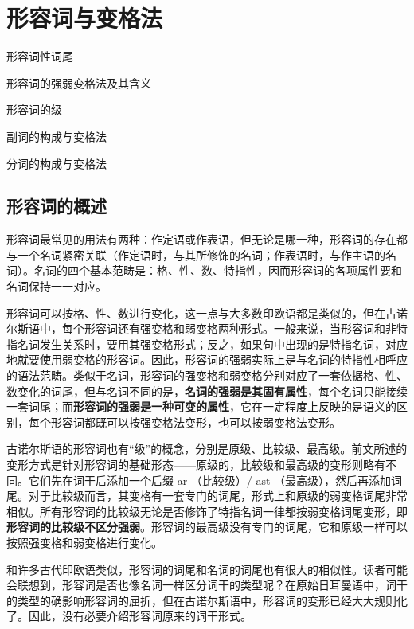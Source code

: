 \chapter{形容词与变格法}\label{形容词与变格法}

\begin{introduction}[章节要点]
    \item 形容词性词尾
    \item 形容词的强弱变格法及其含义
    \item 形容词的级
    \item 副词的构成与变格法
    \item 分词的构成与变格法
\end{introduction}

\section{形容词的概述}\label{形容词的概述}

形容词最常见的用法有两种：作定语或作表语，但无论是哪一种，形容词的存在都与一个名词紧密关联（作定语时，与其所修饰的名词；作表语时，与作主语的名词）。名词的四个基本范畴是：格、性、数、特指性，因而形容词的各项属性要和名词保持一一对应。

形容词可以按格、性、数进行变化，这一点与大多数印欧语都是类似的，但在古诺尔斯语中，每个形容词还有强变格和弱变格两种形式。一般来说，当形容词和非特指名词发生关系时，要用其强变格形式；反之，如果句中出现的是特指名词，对应地就要使用弱变格的形容词。因此，形容词的强弱实际上是与名词的特指性相呼应的语法范畴。类似于名词，形容词的强变格和弱变格分别对应了一套依据格、性、数变化的词尾，但与名词不同的是，\textbf{名词的强弱是其固有属性}，每个名词只能接续一套词尾；而\textbf{形容词的强弱是一种可变的属性}，它在一定程度上反映的是语义的区别，每个形容词都既可以按强变格法变形，也可以按弱变格法变形。

古诺尔斯语的形容词也有“级”的概念，分别是原级、比较级、最高级。前文所述的变形方式是针对形容词的基础形态——原级的，比较级和最高级的变形则略有不同。它们先在词干后添加一个后缀-ar-（比较级）/-ast-（最高级），然后再添加词尾。对于比较级而言，其变格有一套专门的词尾，形式上和原级的弱变格词尾非常相似。所有形容词的比较级无论是否修饰了特指名词一律都按弱变格词尾变形，即\textbf{形容词的比较级不区分强弱}。形容词的最高级没有专门的词尾，它和原级一样可以按照强变格和弱变格进行变化。

和许多古代印欧语类似，形容词的词尾和名词的词尾也有很大的相似性。读者可能会联想到，形容词是否也像名词一样区分词干的类型呢？在原始日耳曼语中，词干的类型的确影响形容词的屈折，但在古诺尔斯语中，形容词的变形已经大大规则化了。因此，没有必要介绍形容词原来的词干形式。

